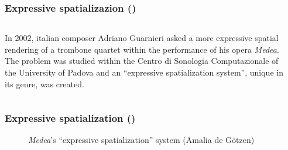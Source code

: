 \setcounter{ms}{0}
\begin{frame}
    \frametitle<+- | alert@+->{Expressive spatializazion ()}

    \begin{columns}[T]
        \begin{column}{0.7\textwidth}
						\alert{In 2002, italian composer Adriano Guarnieri asked a more
						expressive spatial rendering of a trombone quartet within the
						performance of his opera \emph{Medea}.
					  The problem was studied within the Centro di Sonologia
						Computazionale of the University of Padova and an ``expressive
						spatialization system'', unique in its genre, was created.}
        \end{column}
        \begin{column}{0.3\textwidth}
        \end{column}
    \end{columns}
    
\end{frame}

\begin{frame}
    \frametitle{Expressive spatialization ()}

    \begin{center}
        \begin{figure}
            \begin{center}
            \end{center}
						\caption{\alert{\emph{Medea}'s ``expressive spatialization'' system (Amalia de G\"otzen)}}
            \label{fig:medea processing}
        \end{figure}
    \end{center}
    
\end{frame}
